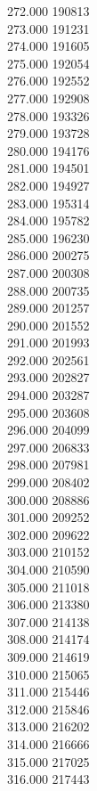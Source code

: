 { 272.000	190813 \\
 273.000	191231 \\
 274.000	191605 \\
 275.000	192054 \\
 276.000	192552 \\
 277.000	192908 \\
 278.000	193326 \\
 279.000	193728 \\
 280.000	194176 \\
 281.000	194501 \\
 282.000	194927 \\
 283.000	195314 \\
 284.000	195782 \\
 285.000	196230 \\
 286.000	200275 \\
 287.000	200308 \\
 288.000	200735 \\
 289.000	201257 \\
 290.000	201552 \\
 291.000	201993 \\
 292.000	202561 \\
 293.000	202827 \\
 294.000	203287 \\
 295.000	203608 \\
 296.000	204099 \\
 297.000	206833 \\
 298.000	207981 \\
 299.000	208402 \\
 300.000	208886 \\
 301.000	209252 \\
 302.000	209622 \\
 303.000	210152 \\
 304.000	210590 \\
 305.000	211018 \\
 306.000	213380 \\
 307.000	214138 \\
 308.000	214174 \\
 309.000	214619 \\
 310.000	215065 \\
 311.000	215446 \\
 312.000	215846 \\
 313.000	216202 \\
 314.000	216666 \\
 315.000	217025 \\
 316.000	217443 \\
}
